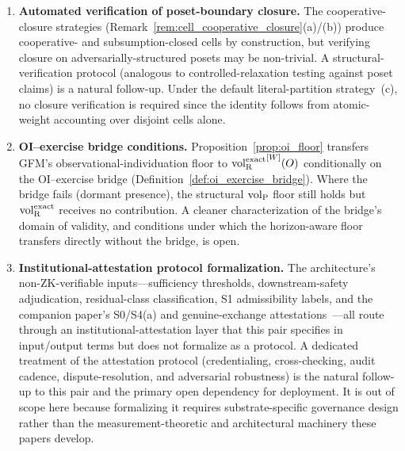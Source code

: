 \begin{enumerate}
\item \label{oq:gap_decomp_closure}
\textbf{Automated verification of poset-boundary closure.}
The cooperative-closure strategies
(Remark~\ref{rem:cell_cooperative_closure}(a)/(b)) produce
cooperative- and subsumption-closed cells by construction, but
verifying closure on adversarially-structured posets may be
non-trivial.  A structural-verification protocol
(analogous to controlled-relaxation testing against poset
claims) is a natural follow-up.  Under the default
literal-partition strategy~(c), no closure verification is
required since the identity follows from atomic-weight
accounting over disjoint cells alone.

\item \label{oq:oi_bridge}
\textbf{OI--exercise bridge conditions.}
Proposition~\ref{prop:oi_floor} transfers GFM's
observational-individuation floor to ${\operatorname{vol}_{\mathrm{R}}^{\mathrm{exact}}}^{[W]}(O)$
conditionally on the OI--exercise bridge
(Definition~\ref{def:oi_exercise_bridge}).  Where the bridge
fails (dormant presence), the structural ${\operatorname{vol}_{\mathrm{P}}}$ floor still
holds but ${\operatorname{vol}_{\mathrm{R}}^{\mathrm{exact}}}$ receives no contribution.  A cleaner
characterization of the bridge's domain of validity, and
conditions under which the horizon-aware floor transfers directly
without the bridge, is open.

\item \label{oq:attestation_protocol}
\textbf{Institutional-attestation protocol formalization.}
The architecture's non-ZK-verifiable inputs---sufficiency
thresholds, downstream-safety adjudication, residual-class
classification, S1 admissibility labels, and the
companion paper's S0/S4(a) and genuine-exchange
attestations~\citep[Revealed~Sacrifice, Remark on external
attestation]{lasser2026paper8a}---all route through an
institutional-attestation layer that this pair specifies in
input/output terms but does not formalize as a protocol.
A dedicated treatment of the attestation protocol
(credentialing, cross-checking, audit cadence,
dispute-resolution, and adversarial robustness) is the natural
follow-up to this pair and the primary open dependency for
deployment.  It is out of scope here because formalizing it
requires substrate-specific governance design rather than the
measurement-theoretic and architectural machinery these papers
develop.

\end{enumerate}
